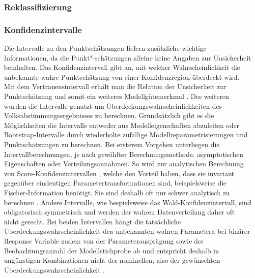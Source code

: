 \documentclass{Vorlage}
\begin{document}
\subsubsection{Reklassifizierung}

\subsubsection{Konfidenzintervalle}
Die Intervalle zu den Punktschätzungen liefern zusätzliche wichtige Informationen, da die Punkt"-schätzungen alleine keine Angaben zur Unsicherheit beinhalten. Das Konfidenzintervall gibt an, mit welcher Wahrscheinlichkeit die unbekannte wahre Punktschätzung von einer Konfidenzregion überdeckt wird. Mit dem Vertrauensintervall erhält man die Relation der Unsicherheit zur Punktschätzung und somit ein weiteres Modellgütemerkmal \cite[p. 471]{fahrmeir2013regression}. Des weiteren wurden die Intervalle genutzt um Überdeckungswahrscheinlichkeiten des Volksabstimmungsergebnisses \cite{Amt} zu berechnen. Grundsätzlich gibt es die Möglichkeiten die Intervalle entweder aus Modelleigenschaften abzuleiten oder Bootstrap-Intervalle durch wiederholte zufällige Modellreparametrisierungen und Punktschätzungen zu berechnen. Bei ersterem Vorgehen unterliegen die Intervallberechnungen, je nach gewählter Berechnungsmethode, asymptotischen Eigenschaften oder Verteilungsannahmen. So wird zur analytischen Berechnung von Score-Konfidenzintervallen \cite[p. 64 ff.]{held2008}, welche den Vorteil haben, dass sie invariant gegenüber eindeutigen Parametertransformationen sind, beispielsweise die Fischer-Information benötigt. Sie sind deshalb oft nur schwer analytisch zu berechnen \cite[p. 74]{held2008}. Andere Intervalle, wie bespielsweise das Wald-Konfidenzintervall, sind obligatorisch symmetrisch \cite[p. 60]{held2008} und werden der wahren Datenverteilung daher oft nicht gerecht. Bei beiden Intervallen hängt die tatsächliche Überdeckungswahrscheinlichkeit dea unbekannten wahren Parametera bei binärer Response Variable zudem von der Parameterausprägung sowie der Beobachtungsanzahl der Modellstichprobe ab und entspricht deshalb in ungünstigen Kombinationen nicht der nominellen, also der gewünschten Überdeckungswahrscheinlichkeit \cite{Int}. 
\end{document}

